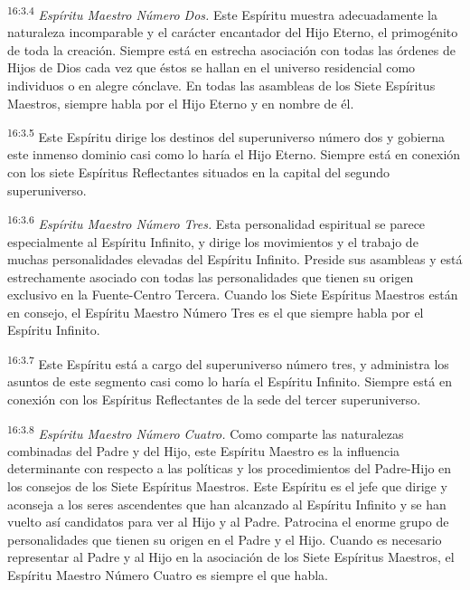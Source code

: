 \par
\textsuperscript{16:3.4} \textit{Espíritu Maestro Número Dos.} Este Espíritu muestra adecuadamente la naturaleza incomparable y el carácter encantador del Hijo Eterno, el primogénito de toda la creación. Siempre está en estrecha asociación con todas las órdenes de Hijos de Dios cada vez que éstos se hallan en el universo residencial como individuos o en alegre cónclave. En todas las asambleas de los Siete Espíritus Maestros, siempre habla por el Hijo Eterno y en nombre de él.

\par
\textsuperscript{16:3.5} Este Espíritu dirige los destinos del superuniverso número dos y gobierna este inmenso dominio casi como lo haría el Hijo Eterno. Siempre está en conexión con los siete Espíritus Reflectantes situados en la capital del segundo superuniverso.

\par
\textsuperscript{16:3.6} \textit{Espíritu Maestro Número Tres.} Esta personalidad espiritual se parece especialmente al Espíritu Infinito, y dirige los movimientos y el trabajo de muchas personalidades elevadas del Espíritu Infinito. Preside sus asambleas y está estrechamente asociado con todas las personalidades que tienen su origen exclusivo en la Fuente-Centro Tercera. Cuando los Siete Espíritus Maestros están en consejo, el Espíritu Maestro Número Tres es el que siempre habla por el Espíritu Infinito.

\par
\textsuperscript{16:3.7} Este Espíritu está a cargo del superuniverso número tres, y administra los asuntos de este segmento casi como lo haría el Espíritu Infinito. Siempre está en conexión con los Espíritus Reflectantes de la sede del tercer superuniverso.

\par
\textsuperscript{16:3.8} \textit{Espíritu Maestro Número Cuatro.} Como comparte las naturalezas combinadas del Padre y del Hijo, este Espíritu Maestro es la influencia determinante con respecto a las políticas y los procedimientos del Padre-Hijo en los consejos de los Siete Espíritus Maestros. Este Espíritu es el jefe que dirige y aconseja a los seres ascendentes que han alcanzado al Espíritu Infinito y se han vuelto así candidatos para ver al Hijo y al Padre. Patrocina el enorme grupo de personalidades que tienen su origen en el Padre y el Hijo. Cuando es necesario representar al Padre y al Hijo en la asociación de los Siete Espíritus Maestros, el Espíritu Maestro Número Cuatro es siempre el que habla.

